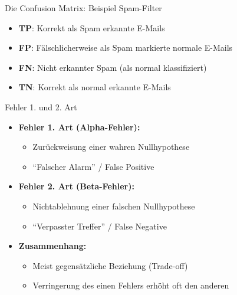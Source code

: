 \documentclass[
  ignorenonframetext,
]{beamer}
\providecommand{\tightlist}{%
  \setlength{\itemsep}{0pt}\setlength{\parskip}{0pt}}
\begin{document}
\begin{frame}{Die Confusion Matrix: Beispiel Spam-Filter}
\protect{}\label{die-confusion-matrix-beispiel-spam-filter}
\begin{itemize}
\tightlist
\item
  \textbf{TP}: Korrekt als Spam erkannte E-Mails
\item
  \textbf{FP}: Fälschlicherweise als Spam markierte normale E-Mails
\item
  \textbf{FN}: Nicht erkannter Spam (als normal klassifiziert)
\item
  \textbf{TN}: Korrekt als normal erkannte E-Mails
\end{itemize}
\end{frame}

\begin{frame}{Fehler 1. und 2. Art}
\protect{}\label{fehler-1.-und-2.-art}
\begin{itemize}
\tightlist
\item
  \textbf{Fehler 1. Art (Alpha-Fehler):}

  \begin{itemize}
  \tightlist
  \item
    Zurückweisung einer wahren Nullhypothese
  \item
    ``Falscher Alarm'' / False Positive
  \end{itemize}
\item
  \textbf{Fehler 2. Art (Beta-Fehler):}

  \begin{itemize}
  \tightlist
  \item
    Nichtablehnung einer falschen Nullhypothese
  \item
    ``Verpasster Treffer'' / False Negative
  \end{itemize}
\item
  \textbf{Zusammenhang:}

  \begin{itemize}
  \tightlist
  \item
    Meist gegensätzliche Beziehung (Trade-off)
  \item
    Verringerung des einen Fehlers erhöht oft den anderen
  \end{itemize}
\end{itemize}
\end{frame}
\end{document}
